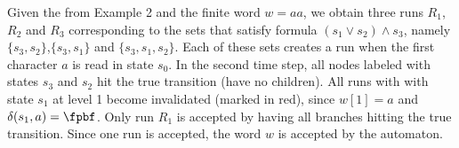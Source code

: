 \begin{example}
    Given the \AFW from Example 2 and the finite word $w=aa$, we obtain three runs $R_1$, $R_2$ and $R_3$ corresponding to the sets that satisfy formula $(s_1 \vee s_2) \wedge s_3$, namely $\{s_3,s_2\}$,$\{s_3,s_1\}$ and $\{s_3,s_1,s_2\}$. 
    Each of these sets creates a run when the first character $a$ is read in state $s_0$. In the second time step, all nodes labeled with states $s_3$ and $s_2$ hit the true transition (have no children). All runs with with state $s_1$ at level 1 become invalidated (marked in red), since $w[1]=a$ and $\delta(s_1,a)=\fpbf$. Only run $R_1$ is accepted by having all branches hitting the true transition. Since one run is accepted, the word $w$ is accepted by the automaton. 

    
\end{example}